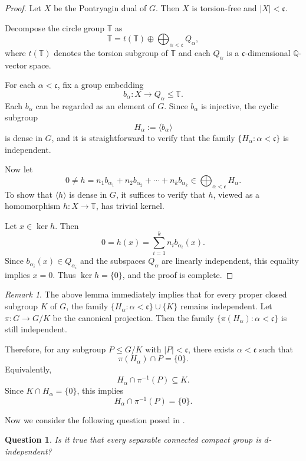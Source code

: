 \documentclass[12pt]{amsart}
\newtheorem{question}[theorem]{Question}
\theoremstyle{definition}
\theoremstyle{remark}
\newtheorem{remark}[theorem]{Remark}
\newcommand{\hull}[1]{\langle #1 \rangle}
\begin{document}
\begin{proof}
Let $X$ be the Pontryagin dual of $G$.
Then $X$ is torsion-free and $|X|<\mathfrak{c}$.

Decompose the circle group $\mathbb{T}$ as
\[
\mathbb{T} = t(\mathbb{T}) \oplus \bigoplus_{\alpha<\mathfrak{c}} Q_\alpha,
\]
where $t(\mathbb{T})$ denotes the torsion subgroup of $\mathbb{T}$ and each
$Q_\alpha$ is a $\mathfrak{c}$-dimensional $\mathbb{Q}$-vector space.

For each $\alpha<\mathfrak{c}$, fix a group embedding
\[
b_\alpha : X \longrightarrow Q_\alpha \le \mathbb{T}.
\]
Each $b_\alpha$ can be regarded as an element of $G$.
Since $b_\alpha$ is injective, the cyclic subgroup
\[
H_\alpha := \hull{b_\alpha}
\]
is dense in $G$, and it is straightforward to verify that the family
$\{H_\alpha : \alpha<\mathfrak{c}\}$ is independent.

Now let
\[
0 \neq h = n_1 b_{\alpha_1} + n_2 b_{\alpha_2} + \cdots + n_k b_{\alpha_k}
\in \bigoplus_{\alpha<\mathfrak{c}} H_\alpha.
\]
To show that $\hull{h}$ is dense in $G$, it suffices to verify that $h$,
viewed as a homomorphism $h : X \to \mathbb{T}$, has trivial kernel.

Let $x \in \ker h$. Then
\[
0 = h(x) = \sum_{i=1}^k n_i b_{\alpha_i}(x).
\]
Since $b_{\alpha_i}(x)\in Q_{\alpha_i}$ and the subspaces $Q_{\alpha}$ are
linearly independent, this equality implies $x=0$.
Thus $\ker h=\{0\}$, and the proof is complete.
\end{proof}

\begin{remark}\label{re}
The above lemma immediately implies that for every proper closed subgroup $K$ of $G$,
the family $\{H_\alpha : \alpha<\mathfrak{c}\}\cup\{K\}$ remains independent.
Let $\pi: G\to G/K$ be the canonical projection.
Then the family $\{\pi(H_\alpha) : \alpha<\mathfrak{c}\}$ is still independent.

Therefore, for any subgroup $P\leq G/K$ with $|P|<\mathfrak{c}$,
there exists $\alpha<\mathfrak{c}$ such that
\[
\pi(H_\alpha)\cap P=\{0\}.
\]
Equivalently,
\[
H_\alpha\cap \pi^{-1}(P)\subseteq K.
\]
Since $K\cap H_\alpha=\{0\}$, this implies
\[
H_\alpha\cap \pi^{-1}(P)=\{0\}.
\]
\end{remark}

Now we consider the following question posed in \cite{MT}.

\begin{question}\label{q1}
Is it true that every separable connected compact group is $d$-independent?
\end{question}
\end{document}
